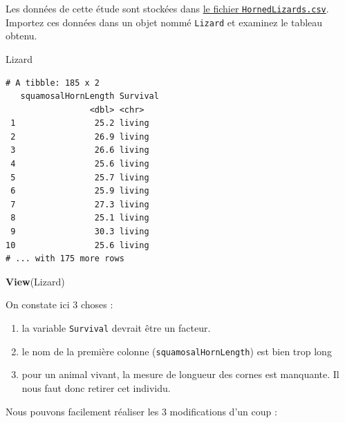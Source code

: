 \documentclass[
  a4paper,
]{article}
\newenvironment{Shaded}{\begin{snugshade}}{\end{snugshade}}
\newcommand{\DataTypeTok}[1]{\textcolor[rgb]{0.00,0.34,0.68}{#1}}
\newcommand{\KeywordTok}[1]{\textcolor[rgb]{0.12,0.11,0.11}{\textbf{#1}}}
\newcommand{\NormalTok}[1]{\textcolor[rgb]{0.12,0.11,0.11}{#1}}
\newcommand{\OperatorTok}[1]{\textcolor[rgb]{0.12,0.11,0.11}{#1}}
\newcommand{\StringTok}[1]{\textcolor[rgb]{0.75,0.01,0.01}{#1}}
\providecommand{\tightlist}{%
  \setlength{\itemsep}{0pt}\setlength{\parskip}{0pt}}
\begin{document}
Les données de cette étude sont stockées dans \href{https://besibo.github.io/Biometrie3/data/HornedLizards.csv}{le fichier \texttt{HornedLizards.csv}}. Importez ces données dans un objet nommé \texttt{Lizard} et examinez le tableau obtenu.

\begin{Shaded}
\begin{Highlighting}[]
\NormalTok{Lizard}
\end{Highlighting}
\end{Shaded}

\begin{verbatim}
# A tibble: 185 x 2
   squamosalHornLength Survival
                 <dbl> <chr>   
 1                25.2 living  
 2                26.9 living  
 3                26.6 living  
 4                25.6 living  
 5                25.7 living  
 6                25.9 living  
 7                27.3 living  
 8                25.1 living  
 9                30.3 living  
10                25.6 living  
# ... with 175 more rows
\end{verbatim}

\begin{Shaded}
\begin{Highlighting}[]
\KeywordTok{View}\NormalTok{(Lizard)}
\end{Highlighting}
\end{Shaded}

On constate ici 3 choses :

\begin{enumerate}
\def\labelenumi{\arabic{enumi}.}
\tightlist
\item
  la variable \texttt{Survival} devrait être un facteur.
\item
  le nom de la première colonne (\texttt{squamosalHornLength}) est bien trop long
\item
  pour un animal vivant, la mesure de longueur des cornes est manquante. Il nous faut donc retirer cet individu.
\end{enumerate}

Nous pouvons facilement réaliser les 3 modifications d'un coup :

\begin{Shaded}
\end{Shaded}
\end{document}

